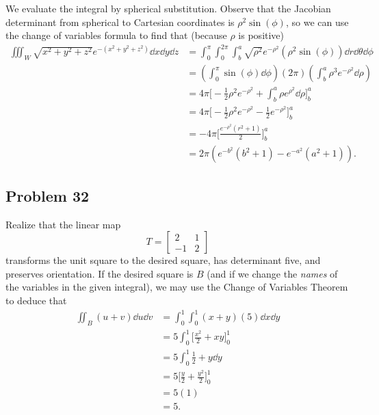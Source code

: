 \documentclass[11pt]{article}
\begin{document}
We evaluate the integral by spherical substitution. Observe that the Jacobian determinant from spherical to Cartesian coordinates is $\rho^{2} \sin(\phi)$, so we can use the change of variables formula to find that (because $\rho$ is positive)
\begin{align*}
	\iiint_{W} \sqrt{x^{2} + y^{2} + z^{2}} e^{-(x^{2} + y^{2} + z^{2})} \dd{x} \dd{y} \dd{z} &= \int_{0}^{\pi} \int_{0}^{2\pi} \int_{b}^{a} \sqrt{\rho^{2}} e^{-\rho^{2}} (\rho^{2} \sin(\phi)) \dd{r} \dd{\theta} \dd{\phi} \\
	&= \left( \int_{0}^{\pi} \sin(\phi) \dd{\phi} \right) (2\pi) \left( \int_{b}^{a} \rho^{3} e^{-\rho^{2}} \dd{\rho} \right) \\
	&= 4\pi \Big[ -\tfrac{1}{2} \rho^{2} e^{-\rho^{2}} + \int_{b}^{a} \rho e^{\rho^{2}} \dd{\rho} \Big]_{b}^{a} \\
	&= 4\pi \Big[ -\tfrac{1}{2} \rho^{2} e^{-\rho^{2}} - \tfrac{1}{2} e^{-\rho^{2}} \Big]_{b}^{a} \\
	&= -4\pi \Big[ \frac{e^{-\rho^{2}}(r^{2} + 1)}{2} \Big]_{b}^{a} \\
	&= \boxed{2\pi \left( e^{-b^{2}} (b^{2} + 1) - e^{-a^{2}} (a^{2} + 1) \right)}.
\end{align*}



\subsection*{Problem 32}

Realize that the linear map
\[
	T = \begin{bmatrix} 2 & 1 \\ -1 & 2 \end{bmatrix}
\]
transforms the unit square to the desired square, has determinant five, and preserves orientation. If the desired square is $B$ (and if we change the \textit{names} of the variables in the given integral), we may use the Change of Variables Theorem to deduce that
\begin{align*}
	\iint_{B} (u + v) \dd{u} \dd{v} &= \int_{0}^{1} \int_{0}^{1} (x + y) (5) \dd{x} \dd{y} \\
	&= 5 \int_{0}^{1} \Big[ \frac{x^{2}}{2} + xy \Big]_{0}^{1} \\
	&= 5 \int_{0}^{1} \frac{1}{2} + y \dd{y} \\
	&= 5 \Big[ \frac{y}{2} + \frac{y^{2}}{2} \Big]_{0}^{1} \\
	&= 5 (1) \\
	&= \boxed{5}.
\end{align*}
\end{document}
